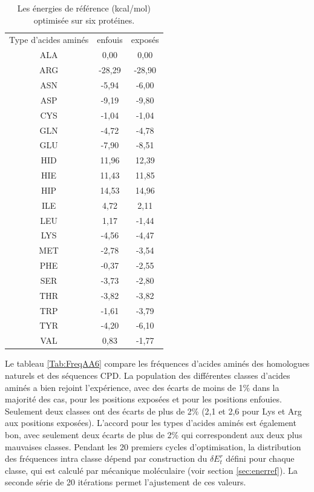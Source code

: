     \begin{table}[!htbp]
      \centering
      \caption{Les énergies de référence (kcal/mol) optimisée sur six protéines.}
      \begin{tabular}{ccc}

        \toprule
        Type d'acides aminés & enfouis & exposés \\
        \cmidrule{1-3}

        ALA & 0,00     &  0,00     \\
        ARG & -28,29   &  -28,90   \\
        ASN & -5,94    &  -6,00    \\
        ASP & -9,19    &  -9,80    \\
        CYS & -1,04    &  -1,04    \\
        GLN & -4,72    &  -4,78    \\
        GLU & -7,90    &  -8,51    \\
        HID & 11,96    &  12,39    \\
        HIE & 11,43    &  11,85    \\
        HIP & 14,53    &  14,96    \\
        ILE & 4,72     &  2,11     \\
        LEU & 1,17     &  -1,44    \\
        LYS & -4,56    &  -4,47    \\
        MET & -2,78    &  -3,54    \\
        PHE & -0,37    &  -2,55    \\
        SER & -3,73    &  -2,80    \\
        THR & -3,82    &  -3,82    \\
        TRP & -1,61    &  -3,79    \\
        TYR & -4,20    &  -6,10    \\
        VAL & 0,83     &  -1,77    \\

        \bottomrule
      \end{tabular}      

\label{tab:RefEner6}      
    \end{table}

Le tableau \ref{Tab:FreqAA6} compare les fréquences d'acides aminés des homologues naturels et des séquences CPD. La population des différentes classes d'acides aminés a bien rejoint l'expérience, avec des écarts de moins de 1\% dans la majorité des cas, pour les positions exposées et pour les positions enfouies. Seulement deux classes ont des écarts de plus de 2\% (2,1 et 2,6 pour Lys et Arg aux positions exposées). L'accord pour les types d'acides aminés est également bon, avec seulement deux écarts de plus de 2\% qui correspondent aux deux plus mauvaises classes. Pendant les 20 premiers cycles d'optimisation, la distribution des fréquences intra classe dépend par construction du $\delta E_t^r$ défini pour chaque classe, qui est calculé par mécanique moléculaire (voir section \ref{sec:enerref}). La seconde série de 20 itérations permet l'ajustement de ces valeurs. 
    

